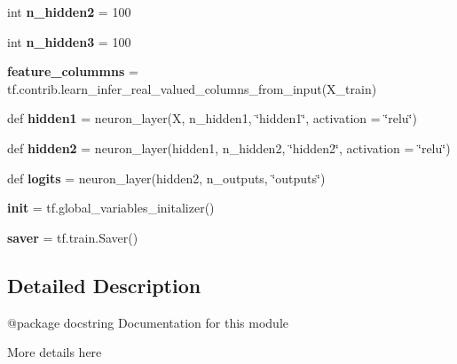 \begin{DoxyCompactItemize}
int {\bfseries n\+\_\+hidden2} = 100
\item 
\mbox{\label{namespacechemistry2quant_1_1chem2quant__analysis_a892749c0643a074cbfe4c740cf958a44}} 
int {\bfseries n\+\_\+hidden3} = 100
\item 
\mbox{\label{namespacechemistry2quant_1_1chem2quant__analysis_a5aea0d4e1c6fbf74d540809ab32cb821}} 
{\bfseries feature\+\_\+colummns} = tf.\+contrib.\+learn\+\_\+infer\+\_\+real\+\_\+valued\+\_\+columns\+\_\+from\+\_\+input(X\+\_\+train)
\item 
\mbox{\label{namespacechemistry2quant_1_1chem2quant__analysis_a96f8355fe78c70265e0b51b533ca9567}} 
def {\bfseries hidden1} = neuron\+\_\+layer(X, n\+\_\+hidden1, \char`\"{}hidden1\char`\"{}, activation = \char`\"{}relu\char`\"{})
\item 
\mbox{\label{namespacechemistry2quant_1_1chem2quant__analysis_a36b629c603687948067d5de7b94d4d82}} 
def {\bfseries hidden2} = neuron\+\_\+layer(hidden1, n\+\_\+hidden2, \char`\"{}hidden2\char`\"{}, activation = \char`\"{}relu\char`\"{})
\item 
\mbox{\label{namespacechemistry2quant_1_1chem2quant__analysis_a643325fa63e35ef454fd7104ed405b9a}} 
def {\bfseries logits} = neuron\+\_\+layer(hidden2, n\+\_\+outputs, \char`\"{}outputs\char`\"{})
\item 
\mbox{\label{namespacechemistry2quant_1_1chem2quant__analysis_adf0eae946dfb0878ef93535ee235a05e}} 
{\bfseries init} = tf.\+global\+\_\+variables\+\_\+initalizer()
\item 
\mbox{\label{namespacechemistry2quant_1_1chem2quant__analysis_ad07dd3a7e649a815ed01efbbd351b3ed}} 
{\bfseries saver} = tf.\+train.\+Saver()
\end{DoxyCompactItemize}


\subsection{Detailed Description}
\begin{DoxyVerb}@package docstring 
Documentation for this module

More details here \end{DoxyVerb}
 

